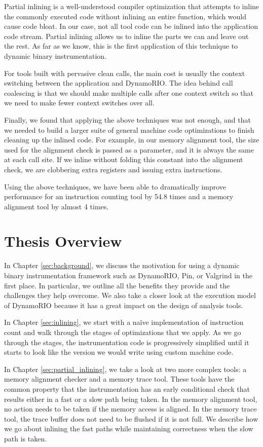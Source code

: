 Partial inlining is a well-understood compiler optimization that attempts to
inline the commonly executed code without inlining an entire function, which
would cause code bloat.  In our case, not all tool code can be inlined into the
application code stream.  Partial inlining allows us to inline the parts we can
and leave out the rest.  As far as we know, this is the first application of
this technique to dynamic binary instrumentation.

For tools built with pervasive clean calls, the main cost is
usually the context switching between the application and DynamoRIO.  The idea
behind call coalescing is that we should make multiple calls after one context
switch so that we need to make fewer context switches over all.

Finally, we found that applying the above techniques was not enough, and that we
needed to build a larger suite of general machine code optimizations to finish
cleaning up the inlined code.  For example, in our memory alignment tool, the
size used for the alignment check is passed as a parameter, and it is always the
same at each call site.  If we inline without folding this constant into the
alignment check, we are clobbering extra registers and issuing extra
instructions.

Using the above techniques, we have been able to dramatically improve
performance for an instruction counting tool by 54.8 times and a memory
alignment tool by almost 4 times.

\section{Thesis Overview}

In Chapter \ref{sec:background}, we discuss the motivation for using a dynamic
binary instrumentation framework such as DynamoRIO, Pin, or Valgrind in the
first place.  In particular, we outline all the benefits they provide and the
challenges they help overcome.  We also take a closer look at the execution
model of DynamoRIO because it has a great impact on the design of analysis
tools.

In Chapter \ref{sec:inlining}, we start with a na\"ive implementation of
instruction count and walk through the stages of optimizations that we apply.
As we go through the stages, the instrumentation code is progressively
simplified until it starts to look like the version we would write using custom
machine code.

In Chapter \ref{sec:partial_inlining}, we take a look at two more complex tools:
a memory alignment checker and a memory trace tool.  These tools have the common
property that the instrumentation has an early conditional check that results
either in a fast or a slow path being taken.  In the memory alignment tool, no
action needs to be taken if the memory access is aligned.  In the memory trace
tool, the trace buffer does not need to be flushed if it is not full.  We
describe how we go about inlining the fast paths while maintaining correctness
when the slow path is taken.

